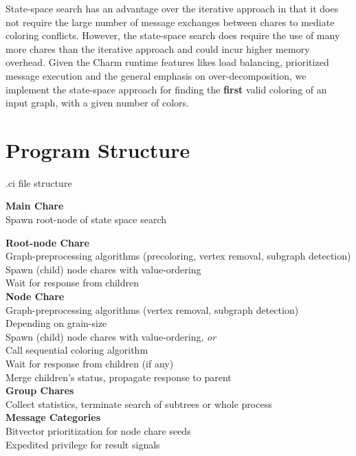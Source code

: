 \documentclass[10pt,oneside]{article}
\begin{document}
  State-space search has an advantage over the iterative approach in that it
  does not require the large number of message exchanges between chares to
  mediate coloring conflicts. However, the state-space search does require the 
  use of many more chares than the iterative approach and could incur 
  higher memory overhead. Given the Charm runtime features likes load balancing, 
  prioritized message execution and the general emphasis on over-decomposition, 
  we implement the state-space approach for finding the \textbf{first} valid coloring 
  of an input graph, with a given number of colors. 
 
\section{Program Structure}

\begin{algorithm}[h]
\caption{.ci file structure} \label{algo:ci}
\begin{algorithmic}[1]
\STATE \textbf{Main Chare} \\
\qquad Spawn root-node of state space search 

\STATE \textbf{Root-node Chare} \\
\qquad Graph-preprocessing algorithms (precoloring, vertex removal, subgraph detection) \\
\qquad Spawn (child) node chares with value-ordering \\ 
\qquad Wait for response from children \\

\STATE \textbf{Node Chare} \\
\qquad Graph-preprocessing algorithms (vertex removal, subgraph detection) \\
\qquad Depending on grain-size \\
\qquad \qquad Spawn (child) node chares with value-ordering, \emph{or} \\
\qquad \qquad Call sequential coloring algorithm \\
\qquad Wait for response from children (if any) \\ 
\qquad Merge children’s status, propagate response to parent \\

\STATE \textbf{Group Chares} \\
\qquad Collect statistics, terminate search of subtrees or whole process \\

\STATE \textbf{Message Categories} \\
\qquad Bitvector prioritization for node chare seeds \\
\qquad Expedited privilege for result signals \\
\end{algorithmic}
\end{algorithm}
\end{document}
